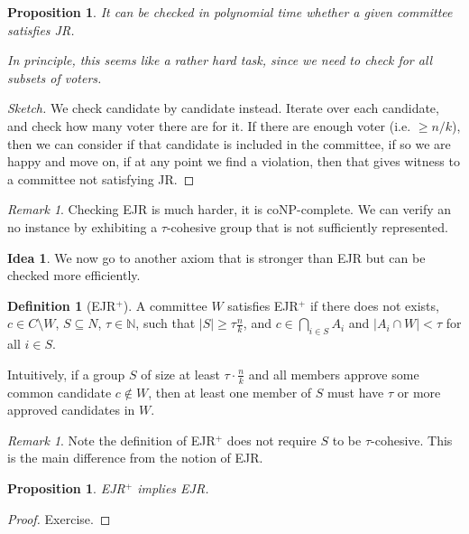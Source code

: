 \documentclass{book}
\newcommand{\unclear}[1]{%
  \par\noindent
  \colorbox{yellow!30}{#1}\par
}
\theoremstyle{plain}
\newtheorem{proposition}[theorem]{Proposition}
\theoremstyle{definition}
\newtheorem{definition}[theorem]{Definition}
\newtheorem{idea}[theorem]{Idea}
\theoremstyle{remark}
\newtheorem{remark}[theorem]{Remark}
\begin{document}
\begin{proposition}
    It can be checked in polynomial time whether a 
    given committee satisfies JR.

    In principle, this seems like a rather hard task, 
    since we need to check for all subsets of voters.
\end{proposition}
\begin{proof}[Sketch]
    We check candidate by candidate instead.
    Iterate over each candidate, 
    and check how many voter there are for it.
    If there are enough voter (i.e. $\geq n / k$),
    then we can consider if that candidate is included in the committee, 
    if so we are happy and move on, if at any point we find a 
    violation, then that gives witness to a committee not 
    satisfying JR.
\end{proof}

\begin{remark}
    Checking EJR is much harder, it is coNP-complete.
    We can verify an no instance by 
    exhibiting a $\tau$-cohesive group that is not sufficiently represented.
\end{remark}


\begin{idea}
    We now go to another axiom that is 
    stronger than EJR but can be checked more efficiently.
\end{idea}

\begin{definition}[EJR$^+$]
    A committee $W$ satisfies 
    EJR$^+$ if there does not exists,
    $c \in C \setminus W$, 
    $S \subseteq N$, 
    $\tau \in \mathbb{N}$, 
    such that 
    $|S| \geq \tau \frac{n}{k}$, 
    and $c \in \bigcap_{i \in S} A_i$
    and $|A_i \cap W| < \tau$ for all $i \in S$.

    Intuitively, if a group $S$ of size at least $\tau \cdot \frac{n}{k}$ 
    and all members approve some common candidate $c \notin W$, 
    then at least one member of $S$ must have $\tau$ or more 
    approved candidates in $W$.
\end{definition}

\begin{remark}
    Note the definition of 
    EJR$^+$ 
    does not require 
    $S$ to be $\tau$-cohesive.
    This is the main difference from the notion of 
    EJR.
\end{remark}

\begin{proposition}
    EJR$^+$ implies EJR.
\end{proposition}
\begin{proof}
    \unclear{Exercise.}
\end{proof}
\end{document}
